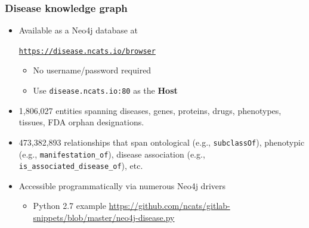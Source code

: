﻿\documentclass[anchorcolor=blue,linkcolor=blue]{beamer}
\begin{document}
\begin{frame}
  \frametitle{Disease knowledge graph}
  \begin{itemize}
  \item Available as a Neo4j database at
    
    \centerline{\href{https://disease.ncats.io/browser}{\texttt{https://disease.ncats.io/browser}}}
    \begin{itemize}
    \item No username/password required
    \item Use \texttt{disease.ncats.io:80} as the \textbf{Host}
    \end{itemize}
  \item 1,806,027 entities spanning diseases, genes, proteins, drugs,
    phenotypes, tissues, FDA orphan designations.
  \item 473,382,893 relationships that span ontological (e.g.,
    \texttt{subclassOf}), phenotypic (e.g.,
    \texttt{manifestation\_of}), disease association (e.g.,
    \texttt{is\_associated\_disease\_of}), etc.
  \item Accessible programmatically via numerous Neo4j drivers
    \begin{itemize}
      \item Python 2.7 example \href{https://github.com/ncats/gitlab-snippets/blob/master/neo4j-disease.py}{https://github.com/ncats/gitlab-snippets/blob/master/neo4j-disease.py}
    \end{itemize}
  \end{itemize}
\end{frame}
\end{document}
